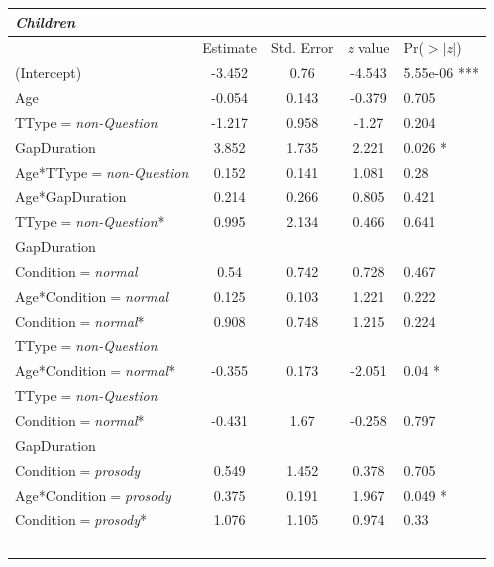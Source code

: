 \documentclass[authoryear, 12pt]{elsarticle}
\begin{document}
\linespread{1}
\begin{minipage}[t]{0.95\linewidth}
\begin{footnotesize}
\begin{longtable}{lcccl}
  \textbf{\textit{Children}} &&&& \\
    \hline
           &  Estimate & Std. Error & \textit{z} value & Pr($>$$|$\textit{z}$|$) \\
    \hline
    (Intercept)											& -3.452		& 0.76	& -4.543	& 5.55e-06 ***	\\
    Age														& -0.054		& 0.143	& -0.379	& 0.705				\\
    TType$=$\textit{non-Question}				& -1.217		& 0.958	& -1.27		& 0.204				\\
    GapDuration											&  3.852		& 1.735	&  2.221	& 0.026 *			\\
    Age*TType$=$\textit{non-Question}		&  0.152		& 0.141	&  1.081	& 0.28				\\
    Age*GapDuration									&  0.214		& 0.266	&  0.805	& 0.421				\\
    TType$=$\textit{non-Question}*			&  0.995		& 2.134	&  0.466	& 0.641				\\
    \hspace*{5mm} GapDuration &&&& \\
	\hline
    Condition$=$\textit{normal}					&  0.54		& 0.742	&  0.728	& 0.467					\\
    Age*Condition$=$\textit{normal}			&  0.125		& 0.103	&  1.221	& 0.222				\\
    Condition$=$\textit{normal}*				&  0.908		& 0.748	&  1.215	& 0.224				\\
    \hspace*{5mm} TType$=$\textit{non-Question} &&&& \\
    Age*Condition$=$\textit{normal}*			& -0.355		& 0.173	& -2.051	& 0.04 *			\\
    \hspace*{5mm} TType$=$\textit{non-Question} &&&& \\
    Condition$=$\textit{normal}*				& -0.431		& 1.67	& -0.258	& 0.797				\\
    \hspace*{5mm} GapDuration &&&& \\
	\hline
    Condition$=$\textit{prosody}				&  0.549		& 1.452	&  0.378	& 0.705				\\
    Age*Condition$=$\textit{prosody}			&  0.375		& 0.191	&  1.967	& 0.049 *			\\
    Condition$=$\textit{prosody}*				&  1.076		& 1.105	&  0.974	& 0.33				\\
$$
\end{longtable}
\end{footnotesize}
\end{minipage}
\end{document}
